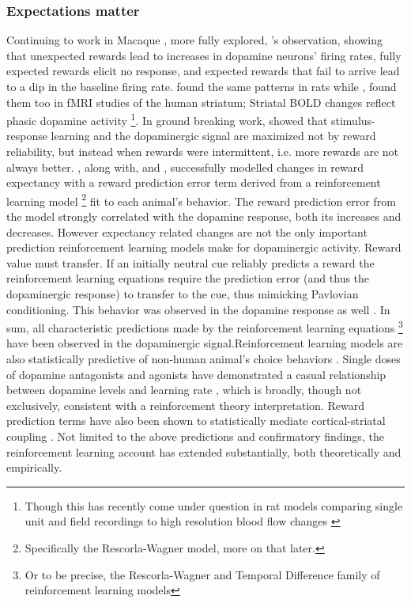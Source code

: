 \documentclass[doc,12pt]{apa}        %
\begin{document}
\subsubsection{Expectations matter} %
\label{subsub:expectations}
Continuing to work in Macaque , more fully explored, 's observation, showing that unexpected rewards lead to increases in dopamine neurons' firing rates, fully expected rewards elicit no response, and expected rewards that fail to arrive lead to a dip in the baseline firing rate.    found the same patterns in rats while , found them too in fMRI studies of the human striatum; Striatal BOLD changes reflect phasic dopamine activity \cite{Schonberg:2009p6669,Surmeier:2007p4435}
\footnote{
    Though this has recently come under question in rat models comparing single unit and field recordings to high resolution blood flow changes \cite{Mishra:2011p9095}}. In ground breaking work,  showed that stimulus-response learning and the dopaminergic signal are maximized not by reward reliability, but instead when rewards were intermittent, i.e. more rewards are not always better.  , along with,  and , successfully modelled changes in reward expectancy with a reward prediction error term derived from a reinforcement learning model
\footnote{
    Specifically the Rescorla-Wagner model, more on that later.
} fit to each animal's behavior. The reward prediction error from the model strongly correlated with the dopamine response, both its increases and decreases. However expectancy related changes are not the only important prediction reinforcement learning models make for dopaminergic activity.  Reward value must transfer.  If an initially neutral cue reliably predicts a reward the reinforcement learning equations require the prediction error (and thus the dopaminergic response) to transfer to the cue, thus mimicking Pavlovian conditioning.  This behavior was observed in the dopamine response as well \cite{Roesch:2007p2519, McClure:2003p3346}.  In sum, all characteristic predictions made by the reinforcement learning equations
\footnote{Or to be precise, the Rescorla-Wagner and Temporal Difference family of reinforcement learning models} have been observed in the dopaminergic signal.Reinforcement learning models are also statistically predictive of non-human animal's choice behaviors \cite{Hampton:2007p2983}.  Single doses of dopamine antagonists and agonists have demonstrated a casual relationship between dopamine levels and learning rate \cite{Pizzagalli:2008p6521, Diaconescu:2010p7631}, which is broadly, though not exclusively, consistent with a reinforcement theory interpretation.  Reward prediction terms have also been shown to statistically mediate cortical-striatal coupling \cite{denOuden:2010p7203}.  Not limited to the above predictions and confirmatory findings, the reinforcement learning account has extended substantially, both theoretically and empirically.
\end{document}
